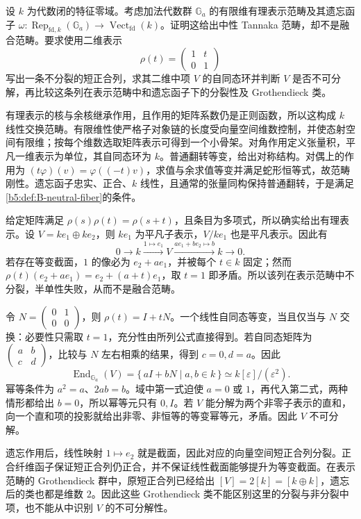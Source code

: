 \begin{exercise}\label{b5:ex:B:16}
	设 \(k\) 为代数闭的特征零域。考虑加法代数群 \(\mathbb G_a\) 的有限维有理表示范畴及其遗忘函子 \(\omega:\operatorname{Rep}_{\mathrm{fd},k}(\mathbb G_a)\to\operatorname{Vect}_{\mathrm{fd}}(k)\)。证明这给出中性 Tannaka 范畴，却不是融合范畴。要求使用二维表示
	\[
		\rho(t)=\begin{pmatrix}1&t\\0&1\end{pmatrix}
	\]
	写出一条不分裂的短正合列，求其二维中项 \(V\) 的自同态环并判断 \(V\) 是否不可分解，再比较这条列在表示范畴中和遗忘函子下的分裂性及 Grothendieck 类。
\end{exercise}
\begin{solution}
	有理表示的核与余核继承作用，且作用的矩阵系数仍是正则函数，所以这构成 \(k\) 线性交换范畴。有限维性使严格子对象链的长度受向量空间维数控制，并使态射空间有限维；按每个维数选取矩阵表示可得到一个小骨架。对角作用定义张量积，平凡一维表示为单位，其自同态环为 \(k\)。普通翻转等变，给出对称结构。对偶上的作用为 \((t\varphi)(v)=\varphi((-t)v)\)，求值与余求值等变并满足蛇形恒等式，故范畴刚性。遗忘函子忠实、正合、\(k\) 线性，且通常的张量同构保持普通翻转，于是满足\cref{b5:def:B-neutral-fiber}的条件。

	给定矩阵满足 \(\rho(s)\rho(t)=\rho(s+t)\)，且条目为多项式，所以确实给出有理表示。设 \(V=ke_1\oplus ke_2\)，则 \(ke_1\) 为平凡子表示，\(V/ke_1\) 也是平凡表示。因此有
	\[
		0\longrightarrow k\xrightarrow{1\mapsto e_1}V
		\xrightarrow{ae_1+be_2\mapsto b}k\longrightarrow0.
	\]
	若存在等变截面，\(1\) 的像必为 \(e_2+ae_1\)，并被每个 \(t\in k\) 固定；然而 \(\rho(t)(e_2+ae_1)=e_2+(a+t)e_1\)，取 \(t=1\) 即矛盾。所以该列在表示范畴中不分裂，半单性失败，从而不是融合范畴。

	令 \(N=\begin{pmatrix}0&1\\0&0\end{pmatrix}\)，则 \(\rho(t)=I+tN\)。一个线性自同态等变，当且仅当与 \(N\) 交换：必要性只需取 \(t=1\)，充分性由所列公式直接得到。若自同态矩阵为 \(\begin{pmatrix}a&b\\c&d\end{pmatrix}\)，比较与 \(N\) 左右相乘的结果，得到 \(c=0,d=a\)。因此
	\[
		\operatorname{End}_{\mathbb G_a}(V)
		=\{\,aI+bN\mid a,b\in k\,\}
		\simeq k[\varepsilon]/(\varepsilon^2).
	\]
	幂等条件为 \(a^2=a\)、\(2ab=b\)。域中第一式迫使 \(a=0\) 或 \(1\)，再代入第二式，两种情形都给出 \(b=0\)，所以幂等元只有 \(0,I\)。若 \(V\) 能分解为两个非零子表示的直和，向一个直和项的投影就给出非零、非恒等的等变幂等元，矛盾。因此 \(V\) 不可分解。

	遗忘作用后，线性映射 \(1\mapsto e_2\) 就是截面，因此对应的向量空间短正合列分裂。正合纤维函子保证短正合列仍正合，并不保证线性截面能够提升为等变截面。在表示范畴的 Grothendieck 群中，原短正合列已经给出 \([V]=2[k]=[k\oplus k]\)，遗忘后的类也都是维数 \(2\)。因此这些 Grothendieck 类不能区别这里的分裂与非分裂中项，也不能从中识别 \(V\) 的不可分解性。
\end{solution}

